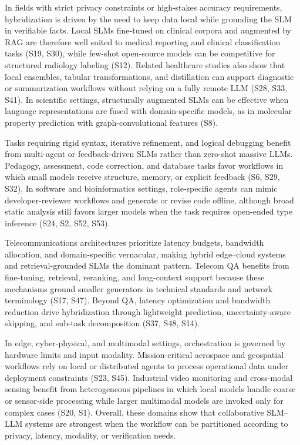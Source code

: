 In fields with strict privacy constraints or high-stakes accuracy requirements, hybridization is driven by the need to keep data local while grounding the SLM in verifiable facts. Local SLMs fine-tuned on clinical corpora and augmented by RAG are therefore well suited to medical reporting and clinical classification tasks (S19, S30), while few-shot open-source models can be competitive for structured radiology labeling (S12). Related healthcare studies also show that local ensembles, tabular transformations, and distillation can support diagnostic or summarization workflows without relying on a fully remote LLM (S28, S33, S41). In scientific settings, structurally augmented SLMs can be effective when language representations are fused with domain-specific models, as in molecular property prediction with graph-convolutional features (S8).

Tasks requiring rigid syntax, iterative refinement, and logical debugging benefit from multi-agent or feedback-driven SLMs rather than zero-shot massive LLMs. Pedagogy, assessment, code correction, and database tasks favor workflows in which small models receive structure, memory, or explicit feedback (S6, S29, S32). In software and bioinformatics settings, role-specific agents can mimic developer-reviewer workflows and generate or revise code offline, although broad static analysis still favors larger models when the task requires open-ended type inference (S24, S2, S52, S53).

Telecommunications architectures prioritize latency budgets, bandwidth allocation, and domain-specific vernacular, making hybrid edge--cloud systems and retrieval-grounded SLMs the dominant pattern. Telecom QA benefits from fine-tuning, retrieval, reranking, and long-context support because these mechanisms ground smaller generators in technical standards and network terminology (S17, S47). Beyond QA, latency optimization and bandwidth reduction drive hybridization through lightweight prediction, uncertainty-aware skipping, and sub-task decomposition (S37, S48, S14).

In edge, cyber-physical, and multimodal settings, orchestration is governed by hardware limits and input modality. Mission-critical aerospace and geospatial workflows rely on local or distributed agents to process operational data under deployment constraints (S23, S45). Industrial video monitoring and cross-modal sensing benefit from heterogeneous pipelines in which local models handle coarse or sensor-side processing while larger multimodal models are invoked only for complex cases (S20, S1). Overall, these domains show that collaborative SLM--LLM systems are strongest when the workflow can be partitioned according to privacy, latency, modality, or verification needs.

